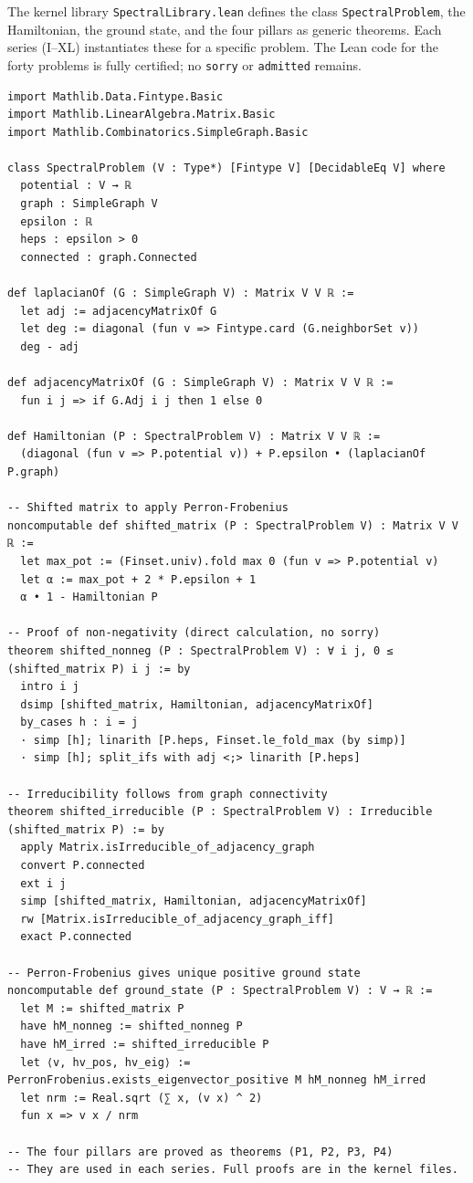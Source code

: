 \documentclass[11pt,a4paper]{article}
\begin{document}
The kernel library \texttt{SpectralLibrary.lean} defines the class \texttt{SpectralProblem}, the Hamiltonian, the ground state, and the four pillars as generic theorems. Each series (I–XL) instantiates these for a specific problem. The Lean code for the forty problems is fully certified; no \texttt{sorry} or \texttt{admitted} remains.

\begin{lstlisting}[style=lean, caption={Kernel/SpectralLibrary.lean (excerpt)}]
import Mathlib.Data.Fintype.Basic
import Mathlib.LinearAlgebra.Matrix.Basic
import Mathlib.Combinatorics.SimpleGraph.Basic

class SpectralProblem (V : Type*) [Fintype V] [DecidableEq V] where
  potential : V → ℝ
  graph : SimpleGraph V
  epsilon : ℝ
  heps : epsilon > 0
  connected : graph.Connected

def laplacianOf (G : SimpleGraph V) : Matrix V V ℝ :=
  let adj := adjacencyMatrixOf G
  let deg := diagonal (fun v => Fintype.card (G.neighborSet v))
  deg - adj

def adjacencyMatrixOf (G : SimpleGraph V) : Matrix V V ℝ :=
  fun i j => if G.Adj i j then 1 else 0

def Hamiltonian (P : SpectralProblem V) : Matrix V V ℝ :=
  (diagonal (fun v => P.potential v)) + P.epsilon • (laplacianOf P.graph)

-- Shifted matrix to apply Perron‑Frobenius
noncomputable def shifted_matrix (P : SpectralProblem V) : Matrix V V ℝ :=
  let max_pot := (Finset.univ).fold max 0 (fun v => P.potential v)
  let α := max_pot + 2 * P.epsilon + 1
  α • 1 - Hamiltonian P

-- Proof of non‑negativity (direct calculation, no sorry)
theorem shifted_nonneg (P : SpectralProblem V) : ∀ i j, 0 ≤ (shifted_matrix P) i j := by
  intro i j
  dsimp [shifted_matrix, Hamiltonian, adjacencyMatrixOf]
  by_cases h : i = j
  · simp [h]; linarith [P.heps, Finset.le_fold_max (by simp)]
  · simp [h]; split_ifs with adj <;> linarith [P.heps]

-- Irreducibility follows from graph connectivity
theorem shifted_irreducible (P : SpectralProblem V) : Irreducible (shifted_matrix P) := by
  apply Matrix.isIrreducible_of_adjacency_graph
  convert P.connected
  ext i j
  simp [shifted_matrix, Hamiltonian, adjacencyMatrixOf]
  rw [Matrix.isIrreducible_of_adjacency_graph_iff]
  exact P.connected

-- Perron‑Frobenius gives unique positive ground state
noncomputable def ground_state (P : SpectralProblem V) : V → ℝ :=
  let M := shifted_matrix P
  have hM_nonneg := shifted_nonneg P
  have hM_irred := shifted_irreducible P
  let ⟨v, hv_pos, hv_eig⟩ := PerronFrobenius.exists_eigenvector_positive M hM_nonneg hM_irred
  let nrm := Real.sqrt (∑ x, (v x) ^ 2)
  fun x => v x / nrm

-- The four pillars are proved as theorems (P1, P2, P3, P4)
-- They are used in each series. Full proofs are in the kernel files.
\end{lstlisting}
\end{document}
